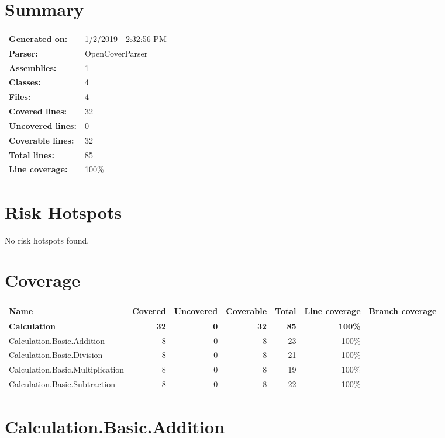 \documentclass[a4paper,landscape,10pt]{article}
\begin{document}
\setcounter{secnumdepth}{-1}
\section{Summary}
\begin{longtable}[l]{ll}
\textbf{Generated on:} & 1/2/2019 - 2:32:56 PM\\
\textbf{Parser:} & OpenCoverParser\\
\textbf{Assemblies:} & 1\\
\textbf{Classes:} & 4\\
\textbf{Files:} & 4\\
\textbf{Covered lines:} & 32\\
\textbf{Uncovered lines:} & 0\\
\textbf{Coverable lines:} & 32\\
\textbf{Total lines:} & 85\\
\textbf{Line coverage:} & 100\%\\
\end{longtable}
\section{Risk Hotspots}
No risk hotspots found.
\section{Coverage}
\begin{longtable}[l]{|l|r|r|r|r|r|r|}
\hline
\textbf{Name} & \textbf{Covered} & \textbf{Uncovered} & \textbf{Coverable} & \textbf{Total} & \textbf{Line coverage} & \textbf{Branch coverage}\\
\hline
\textbf{Calculation} & \textbf{32} & \textbf{0} & \textbf{32} & \textbf{85} & \textbf{100\%} & \textbf{}\\
\hline
Calculation.Basic.Addition & 8 & 0 & 8 & 23 & 100\% & \\
\hline
Calculation.Basic.Division & 8 & 0 & 8 & 21 & 100\% & \\
\hline
Calculation.Basic.Multiplication & 8 & 0 & 8 & 19 & 100\% & \\
\hline
Calculation.Basic.Subtraction & 8 & 0 & 8 & 22 & 100\% & \\
\hline
\end{longtable}
\newpage
\section{Calculation.Basic.Addition}
\end{document}
